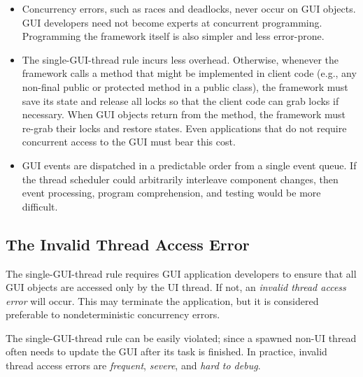 \begin{itemize}

\item Concurrency errors, such as races and deadlocks, never occur on GUI objects. 
GUI developers need not become experts at concurrent programming. Programming the
framework itself is also simpler and less error-prone.

\tinystep

\item The single-GUI-thread rule incurs less overhead.
Otherwise, whenever the framework calls a method that might
be implemented in client code (e.g., any non-final public or protected method in a public class),
the framework must save its state and release all locks so that the client code can grab locks
if necessary. When GUI objects return from the method, the framework must re-grab their locks and
restore states.  Even applications that do not require concurrent access to the GUI
must bear this cost.

\tinystep

\item GUI events are dispatched in a predictable order from a single event queue.
If the thread scheduler could arbitrarily interleave component changes, then event processing,
program comprehension, and testing would be more difficult.
\end{itemize}


\subsection{The Invalid Thread Access Error}

The single-GUI-thread rule requires GUI application developers to
 ensure that all GUI objects are accessed only by the UI thread.
If not, an \textit{invalid thread access error} will occur. This may
terminate the application, but it is considered preferable
to nondeterministic concurrency errors.

The single-GUI-thread rule can be easily violated; since a spawned non-UI thread often needs to update
the GUI  after its  task is finished.
In practice, invalid thread access errors are \textit{frequent}, \textit{severe}, and \textit{hard to debug}.

